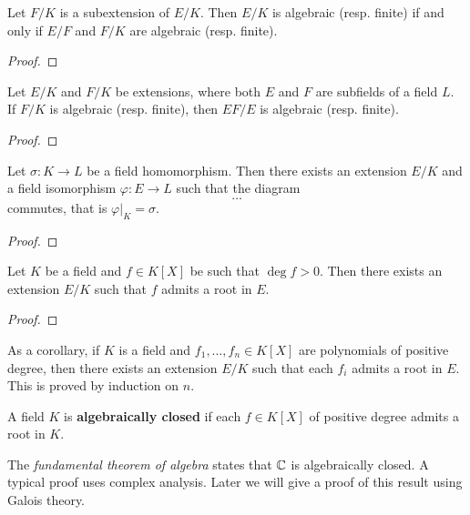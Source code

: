 \begin{proposition}
	Let $F/K$ is a subextension of $E/K$. Then $E/K$ is algebraic (resp. finite)
	if and only if $E/F$ and $F/K$ are algebraic (resp. finite). 
\end{proposition}

\begin{proof}
\end{proof}

\begin{proposition}
	Let $E/K$ and $F/K$ be extensions, where both $E$ and $F$ are subfields of 
	a field $L$. If $F/K$ is algebraic (resp. finite), then $EF/E$ is algebraic (resp. finite).
\end{proposition}

\begin{proof}
\end{proof}

\begin{lemma}
	Let $\sigma\colon K\to L$ be a field homomorphism. Then there exists an extension
	$E/K$ and a field isomorphism $\varphi\colon E\to L$
	such that the diagram
	\[
	\dots	
	\]
	commutes, that is $\varphi|_K=\sigma$. 
\end{lemma}

\begin{proof}
\end{proof}

\begin{theorem}
	Let $K$ be a field and $f\in K[X]$ be such that $\deg f>0$. Then 
	there exists an extension $E/K$ such that $f$ admits a root in $E$. 
\end{theorem}

\begin{proof}
\end{proof}

As a corollary, if $K$ is a field and $f_1,\dots,f_n\in K[X]$ are polynomials 
of positive degree, then there exists an extension $E/K$  such that 
each $f_i$ admits a root in $E$. This is proved by induction on $n$.  

\begin{definition}
	A field $K$ is \textbf{algebraically closed} if each $f\in K[X]$ 
	of positive degree admits a root in $K$. 
\end{definition}

The \emph{fundamental theorem of algebra} states that $\mathbb{C}$ is algebraically closed. A
typical proof uses complex analysis.  Later we will give a proof of this result
using Galois theory. 

